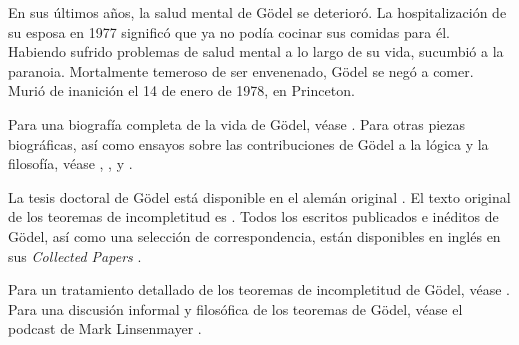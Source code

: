 \documentclass[../../../include/open-logic-section]{subfiles}
\begin{document}
En sus últimos años, la salud mental de G{\"o}del se deterioró. La hospitalización de su esposa en 1977 significó que ya no podía cocinar sus comidas para él. Habiendo sufrido problemas de salud mental a lo largo de su vida, sucumbió a la paranoia. Mortalmente temeroso de ser envenenado, G{\"o}del se negó a comer. Murió de inanición el 14 de enero de 1978, en Princeton.

\begin{reading}
Para una biografía completa de la vida de G{\"o}del, véase \citet{Dawson1997}. Para otras piezas biográficas, así como ensayos sobre las contribuciones de G{\"o}del a la lógica y la filosofía, véase \citet{Wang1990}, \citet{Baaz2011}, \citet{Takeuti2003} y \citet{Sigmund2007}.

La tesis doctoral de G{\"o}del está disponible en el alemán original \citep{Godel1929}. El texto original de los teoremas de incompletitud es \citep{Godel1931}. Todos los escritos publicados e inéditos de G\"odel, así como una selección de correspondencia, están disponibles en inglés en sus \emph{Collected Papers} \citet{Godel1986,Godel1990}.

Para un tratamiento detallado de los teoremas de incompletitud de G{\"o}del, véase \citet{Smith2013}. Para una discusión informal y filosófica de los teoremas de G{\"o}del, véase el podcast de Mark Linsenmayer \citep{Linsenmayer2014}.
\end{reading}
\end{document}
